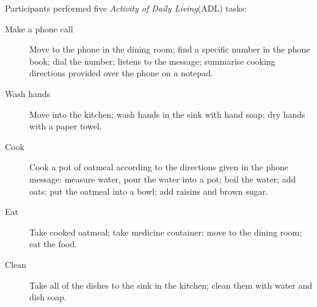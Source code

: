 \documentclass[12pt, a4paper, pdflatex, leqno, twoside]{report}
\begin{document}
Participants performed five \emph{Activity of Daily Living}(ADL) tasks:
\begin{description}
\item[Make a phone call] Move to the phone in the dining room; find a specific number in the phone book; dial the number; listens to the message; summarise cooking directions provided over the phone on a notepad.
\item[Wash hands] Move into the kitchen; wash hands in the sink with hand soap; dry hands with a paper towel.
\item[Cook] Cook a pot of oatmeal according to the directions given in the phone message: measure water, pour the water into a pot; boil the water; add oats; put the oatmeal into a bowl; add raisins and brown sugar.
\item[Eat] Take cooked oatmeal; take medicine container; move to the dining room; eat the food.
\item[Clean] Take all of the dishes to the sink in the kitchen; clean them with water and dish soap.
\end{description}


















\end{document}
